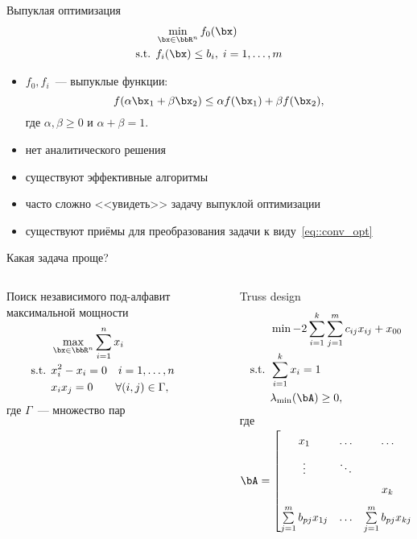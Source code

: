 \documentclass[12pt]{beamer}
\begin{document}
\begin{frame}{Выпуклая оптимизация}
\begin{equation}
\begin{split}
&\min\limits_{\bx \in \bbR^n} f_0(\bx)\\
\text{s.t. } & f_i(\bx) \leq b_i, \; i = 1,\ldots, m
\end{split}
\label{eq::conv_opt}
\end{equation}
\begin{itemize}
\item $f_0, f_i$~--- выпуклые функции:
\[
f(\alpha \bx_1 + \beta \bx_2) \leq \alpha f(\bx_1) + \beta f(\bx_2),
\]
где $\alpha, \beta \geq 0$ и $\alpha + \beta = 1$.
\item нет аналитического решения
\item существуют эффективные алгоритмы
\item часто сложно <<увидеть>> задачу выпуклой оптимизации
\item существуют приёмы для преобразования задачи к виду~\eqref{eq::conv_opt}
\end{itemize}
\end{frame}

\begin{frame}{Какая задача проще?}

\begin{columns}[T]
\begin{column}{0.5\textwidth}
Поиск независимого под-алфавит максимальной мощности
\begin{equation*}
\begin{split}
&\max\limits_{\bx \in \bbR^n} \sum\limits_{i=1}^n x_i\\
\text{s.t. } & x_i^2 - x_i = 0 \quad i = 1,\ldots, n\\
& x_ix_j = 0 \qquad \forall (i, j) \in \Gamma,
\end{split}
\end{equation*}
где $\Gamma$~--- множество пар
\end{column}
~
\begin{column}{0.5\textwidth}
\small
Truss design
\begin{equation*}
\begin{split}
& \min -2\sum\limits_{i=1}^k\sum\limits_{j=1}^m c_{ij} x_{ij} + x_{00}\\
\text{s.t. } & \sum\limits_{i=1}^k x_i = 1\\
& \lambda_{\min}(\bA) \geq 0,
\end{split}
\end{equation*}
\scriptsize
где $\bA = 
\begin{bmatrix}
x_1 & \ldots & \ldots & \sum\limits_{j=1}^m b_{pj}x_{1j}\\
\vdots & \ddots & & \vdots\\
 & & x_k & \sum\limits_{j=1}^m b_{pj}x_{kj}\\
\sum\limits_{j=1}^m b_{pj}x_{1j} & \ldots & \sum\limits_{j=1}^m b_{pj}x_{kj} & x_{00}
\end{bmatrix}
$
\end{column}
\end{columns}

\end{frame}
\end{document}
